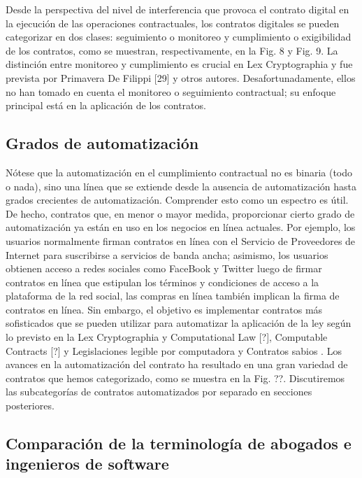 \documentclass[12pt]{report} %
\begin{document}
\begin{itemize}
\begin{enumerate}
\begin{enumerate}
    Desde la perspectiva del nivel de interferencia que provoca el contrato digital en la ejecución de las operaciones contractuales, los contratos digitales se pueden categorizar en dos clases: seguimiento o monitoreo y cumplimiento o exigibilidad de los contratos, como se muestran, respectivamente, en la Fig. 8 y Fig. 9. La distinción entre monitoreo y cumplimiento es crucial en Lex Cryptographia y fue prevista por Primavera De Filippi [29] y otros autores. Desafortunadamente, ellos no han tomado en cuenta el monitoreo o seguimiento contractual; su enfoque principal está en la aplicación de los contratos.

    \subsection{Grados de automatización}

Nótese que la automatización en el cumplimiento contractual no es binaria (todo o nada), sino una línea que se extiende desde la ausencia de automatización hasta grados crecientes de automatización. Comprender esto como un espectro es útil. De hecho, contratos que, en menor o mayor medida, proporcionar cierto grado de automatización ya están en uso en los negocios en línea actuales. Por ejemplo, los usuarios normalmente firman contratos en línea con el Servicio de Proveedores de Internet para suscribirse a servicios de banda ancha; asimismo, los usuarios obtienen acceso a redes sociales como FaceBook y Twitter luego de firmar contratos en línea que estipulan los términos y condiciones de acceso a la plataforma de la red social, las compras en línea también implican la firma de contratos en línea. Sin embargo, el objetivo es implementar contratos más sofisticados que se pueden utilizar para automatizar la aplicación de la ley según lo previsto en la Lex Cryptographia\footnotesize\cite{PrimaveraAaron2018}  y Computational Law [?], Computable Contracts [?] y Legislaciones legible por computadora  y Contratos sabios . Los avances en la automatización del contrato ha resultado en una gran variedad de contratos que hemos categorizado, como se muestra en la Fig. ??. Discutiremos las subcategorías de contratos automatizados por separado en secciones posteriores.


    \subsection{Comparación de la terminología de abogados e ingenieros de software}


\end{enumerate}
\end{enumerate}
\end{itemize}
\end{document}
